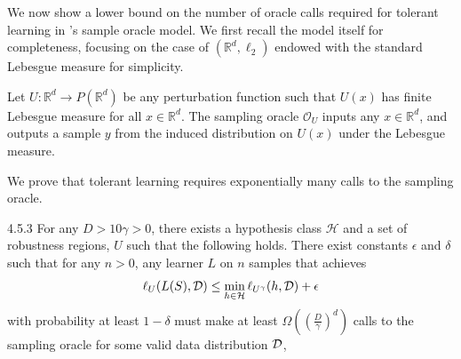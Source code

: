 We now show a lower bound on the number of oracle calls required for tolerant learning in \citet{Urner22}'s sample oracle model. We first recall the model itself for completeness, focusing on the case of $(\mathbb{R}^d,\ell_2)$ endowed with the standard Lebesgue measure for simplicity.
\begin{defn}
Let $U: \mathbb{R}^d \to P(\mathbb{R}^d)$ be any perturbation function such that $U(x)$ has finite Lebesgue measure for all $x \in \mathbb{R}^d$. The sampling oracle $\mathcal{O}_U$ inputs any $x \in \mathbb{R}^d$, and outputs a sample $y$ from the induced distribution on $U(x)$ under the Lebesgue measure.
\end{defn}
We prove that tolerant learning requires exponentially many calls to the sampling oracle.
\begin{customprop}{4.5.3}
For any $D>10\gamma > 0$, there exists a hypothesis class $\mathcal{H}$ and a set of robustness regions, $U$ such that the following holds. There exist constants $\epsilon$ and $\delta$ such that for any $n > 0$, any learner $L$ on $n$  samples that achieves 
$$\ell_U(L(S), \mathcal D) \leq \min_{h \in \mathcal H} \ell_{U^\gamma}(h, \mathcal D) + \epsilon$$
with probability at least $1-\delta$ must make at least $\Omega\left(\left(\frac{D}{\gamma}\right)^d\right)$ calls to the sampling oracle for some valid data distribution $\mathcal D$,
\end{customprop}
